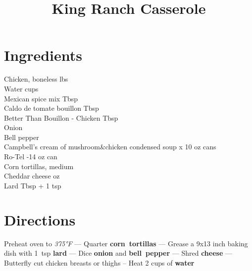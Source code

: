 \documentclass[11pt,letterpaper]{article}
\title{King Ranch Casserole}
\author{}
\date{}
\begin{document}
\maketitle
\thispagestyle{empty}

\section*{Ingredients}
\setlength{\columnsep}{20pt}
\begin{multicols}{2}
\noindent
    Chicken, boneless  lbs \\
    Water  cups \\
    Mexican spice mix  Tbsp \\
    Caldo de tomate bouillon  Tbsp \\
    Better Than Bouillon - Chicken  Tbsp \\
    Onion  \\
    \columnbreak
    Bell pepper  \\
    Campbell's cream of mushroom\&chicken condensed soup  x 10 oz cans \\
    Ro-Tel -14 oz can \\
    Corn tortillas, medium  \\
    Cheddar cheese  oz \\
    Lard  Tbsp + 1 tsp
\end{multicols}

\section*{Directions}

\noindent
Preheat oven to \textit{375°F} ---
Quarter \textbf{corn~tortillas} ---
Grease a 9x13 inch baking dish with 1~tsp \textbf{lard} ---
Dice \textbf{onion} and \textbf{bell~pepper} ---
Shred \textbf{cheese} ---
Butterfly cut chicken breasts or thighs --
Heat 2 cups of \textbf{water}
\end{document}
